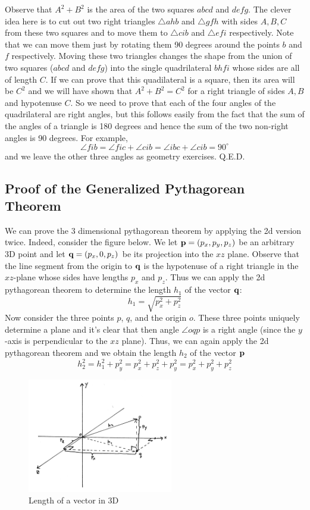 \documentclass{book}
\newcommand{\vect}[1]{{\bf{ #1}}}
\begin{document}
Observe that $A^2+B^2$ is the area of the two squares $abcd$ and $defg$. The clever idea here is to
cut out two right triangles $\triangle ahb$ and $\triangle gfh$ with sides $A,B,C$ from these two squares and to move them to
$\triangle cib$ and $\triangle efi$ respectively.  Note that we can move them just by rotating them 90 degrees around the points $b$ and $f$ respectively.  Moving these two triangles changes the shape from the union of two squares
($abcd$ and $defg$) into the single quadrilateral $bhfi$ whose sides are all of length $C$. If we can prove
that this quadilateral is a square, then its area will be $C^2$ and we will have shown that $A^2+B^2=C^2$
for a right triangle of sides $A,B$ and hypotenuse $C$. So we need to prove that each of the four angles
of the quadrilateral are right angles, but this follows easily from the fact that the sum of the angles
of a triangle is 180 degrees and hence the sum of the two non-right angles is 90 degrees. For example,
\[
\angle fib = \angle fic + \angle cib = \angle ibc + \angle cib = 90^\circ
\]
and we leave the other three angles as geometry exercises.
Q.E.D.

\subsection{Proof of the Generalized Pythagorean Theorem}

We can prove the 3 dimensional pythagorean theorem by applying the 2d version twice. Indeed,
consider the figure below. We let $\vect {p} = (p_x, p_y, p_z)$ be an arbitrary 3D point and
let $\vect q = (p_x, 0, p_z)$ be its projection into the $xz$ plane. Observe that the line
segment from the origin to $\vect{q}$ is the hypotenuse of a right triangle in the $xz$-plane
whose sides have lengths $p_x$ and $p_z$. Thus we can apply the 2d pythagorean theorem
to determine the length $h_1$ of the vector $\vect{q}$:
\[
h_1 = \sqrt{p_x^2 + p_z^2}
\]
Now consider the three points $p$, $q$, and the origin $o$. These three points uniquely determine a
plane and it's clear that then angle $\angle oqp$ is a right angle (since the $y$-axis is perpendicular
to the $xz$ plane). Thus, we can again apply the 2d pythagorean theorem and we obtain the length
$h_2$ of the vector $\vect {p}$
\[
h_2^2 = h_1^2 + p_y^2 = p_x^2 + p_z^2 + p_y^2 = p_x^2 + p_y^2 + p_z^2
\]

\begin{figure}[h]
\centering
\includegraphics[width=2.5in]{images/pyth3D.jpg}
\caption{Length of a vector in 3D \label{fig:pyth3D}}
\end{figure}
\end{document}
